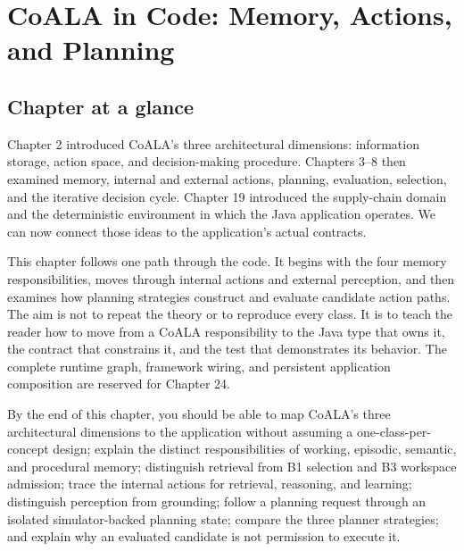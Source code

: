 \providecommand{\ChapterNineteenModulesRef}{\ref{sec:ch19-modules}}
\providecommand{\ChapterNineteenActionBoundaryRef}{\ref{sec:ch19-action-boundary}}
\chapter{CoALA in Code: Memory, Actions, and Planning}
\label{ch:coala-in-code}

\section*{Chapter at a glance}
{}

Chapter 2 introduced CoALA's three architectural dimensions: information storage, action space, and decision-making procedure. Chapters 3--8 then examined memory, internal and external actions, planning, evaluation, selection, and the iterative decision cycle. Chapter 19 introduced the supply-chain domain and the deterministic environment in which the Java application operates. We can now connect those ideas to the application's actual contracts.

This chapter follows one path through the code. It begins with the four memory responsibilities, moves through internal actions and external perception, and then examines how planning strategies construct and evaluate candidate action paths. The aim is not to repeat the theory or to reproduce every class. It is to teach the reader how to move from a CoALA responsibility to the Java type that owns it, the contract that constrains it, and the test that demonstrates its behavior. The complete runtime graph, framework wiring, and persistent application composition are reserved for Chapter 24.

\begin{learningbox}
By the end of this chapter, you should be able to map CoALA's three architectural dimensions to the application without assuming a one-class-per-concept design; explain the distinct responsibilities of working, episodic, semantic, and procedural memory; distinguish retrieval from B1 selection and B3 workspace admission; trace the internal actions for retrieval, reasoning, and learning; distinguish perception from grounding; follow a planning request through an isolated simulator-backed planning state; compare the three planner strategies; and explain why an evaluated candidate is not permission to execute it.
\end{learningbox}

